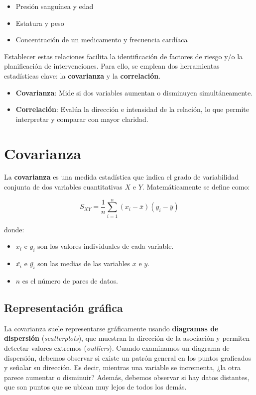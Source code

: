 \documentclass[
  spanish,
  a4paper,
]{scrbook}
\begin{document}
\begin{itemize}
\item
  Presión sanguínea y edad
\item
  Estatura y peso
\item
  Concentración de un medicamento y frecuencia cardíaca
\end{itemize}

Establecer estas relaciones facilita la identificación de factores de
riesgo y/o la planificación de intervenciones. Para ello, se emplean dos
herramientas estadísticas clave: la \textbf{covarianza} y la
\textbf{correlación}.

\begin{itemize}
\item
  \textbf{Covarianza}: Mide si dos variables aumentan o disminuyen
  simultáneamente.
\item
  \textbf{Correlación}: Evalúa la dirección e intensidad de la relación,
  lo que permite interpretar y comparar con mayor claridad.
\end{itemize}

\section{Covarianza}\label{covarianza}

La \textbf{covarianza} es una medida estadística que indica el grado de
variabilidad conjunta de dos variables cuantitativas \(X\) e \(Y\).
Matemáticamente se define como:

\[
S_{XY} = \frac{1}{n} \sum_{i=1}^{n} (x_i - \bar{x})(y_i - \bar{y})
\]

donde:

\begin{itemize}
\item
  \(x_i\) e \(y_i\) son los valores individuales de cada variable.
\item
  \(\bar{x_i}\) e \(\bar{y_i}\) son las medias de las variables \(x\) e
  \(y\).
\item
  \(n\) es el número de pares de datos.
\end{itemize}

\subsection{Representación gráfica}\label{representaciuxf3n-gruxe1fica}

La covarianza suele representarse gráficamente usando \textbf{diagramas
de dispersión} (\emph{scatterplots}), que muestran la dirección de la
asociación y permiten detectar valores extremos (\emph{outliers}).
Cuando examinamos un diagrama de dispersión, debemos observar si existe
un patrón general en los puntos graficados y señalar su dirección. Es
decir, mientras una variable se incrementa, ¿la otra parece aumentar o
disminuir? Además, debemos observar si hay datos distantes, que son
puntos que se ubican muy lejos de todos los demás.
\end{document}
